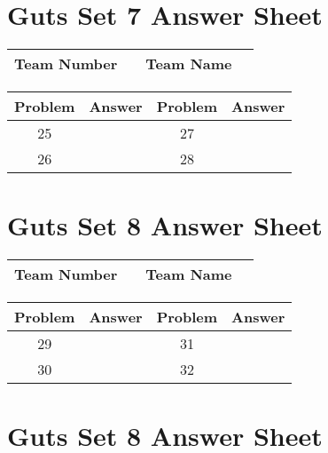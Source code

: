 \documentclass[14pt]{article}
\begin{document}
\vspace{30px}

\section*{Guts Set 7 Answer Sheet}

\begin{center}
\begin{tabular}{|r|r|r|r|}
\hline
	Team Number & \hspace{10em} &
	Team Name & \hspace{15em} \\ \hline
\end{tabular}
\end{center}
\begin{tabularx}{\textwidth}{|c|l|c|X|}\hline
	Problem & Answer & Problem & Answer \\\hline
	25 & \hspace{15em} & 27 & \\\hline
	26 & & 28 & \\\hline
\end{tabularx}

\section*{Guts Set 8 Answer Sheet}

\begin{center}
\begin{tabular}{|r|r|r|r|}
\hline
	Team Number & \hspace{10em} &
	Team Name & \hspace{15em} \\ \hline
\end{tabular}
\end{center}
\begin{tabularx}{\textwidth}{|c|l|c|X|}\hline
	Problem & Answer & Problem & Answer \\\hline
	29 & \hspace{15em} & 31 & \\\hline
	30 & & 32 & \\\hline
\end{tabularx}

\vspace{30px}

\section*{Guts Set 8 Answer Sheet}
\end{document}
